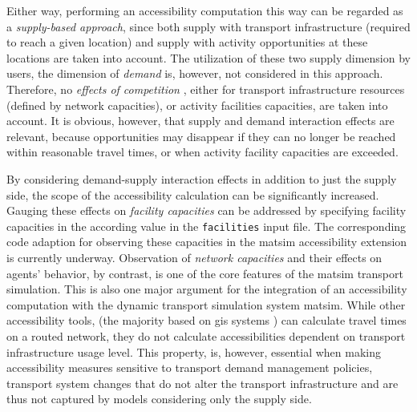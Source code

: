 Either way, performing an accessibility computation this way can be regarded as a \emph{supply-based approach}, 
since both supply with transport infrastructure (required to reach a given location) and supply with 
activity opportunities at these locations are taken into account. The utilization of these two supply dimension by users, 
\ie the dimension of \emph{demand} is, however, not considered in this approach. Therefore, no 
\emph{effects of competition} \citep{Geurs2004AccessibilityReview}, either for transport infrastructure resources 
(defined by network capacities), or activity facilities capacities, are taken into account. It is 
obvious, however, that supply and demand interaction effects are relevant, because opportunities may disappear 
if they can no longer be reached within reasonable travel times, or when activity facility capacities 
are exceeded. 

By considering demand-supply interaction effects in addition to just the
supply side, the scope of the accessibility calculation can be significantly increased.
Gauging these effects on \emph{facility capacities} can be addressed by specifying facility
capacities in the according value in the \lstinline{facilities} input file. The corresponding code adaption for
observing these capacities in the \gls{matsim} accessibility extension is currently underway. Observation of
\emph{network capacities} and their effects on agents' behavior, by contrast, is one of the core features
of the \gls{matsim} transport simulation. This is also one major argument for the integration of an accessibility
computation with the dynamic transport simulation system \gls{matsim}. While other accessibility tools, (the
majority based on \gls{gis} systems
\citep{BBSRErreichbarkeitsmodell, CurtisEtAl2013AccessibilityPolicyInnovation, BuettnerEtAl2010Erreichbarkeitsatlas, LiuZhu2004AccessibilityAnalyst, GulhanEtAl2014PotentialAccessibilityMeasureDenizli})
can calculate travel times on a routed network, they do not calculate accessibilities dependent on transport infrastructure usage
level. This property, is, however, essential when making accessibility measures sensitive to
transport demand management policies, \ie transport system changes that do not alter the transport
infrastructure and are thus not captured by models considering only the supply side.


